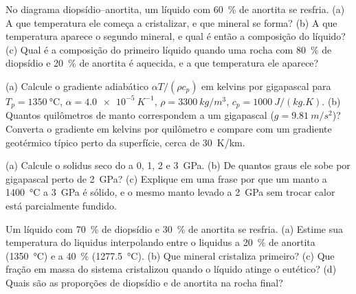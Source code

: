 \begin{exercise}[$\star$]\label{exo:b2:mantle-melting:2}
No diagrama diopsídio--anortita, um líquido com \qty{60}{\percent} de anortita
se resfria. (a) A que temperatura ele começa a cristalizar, e que mineral
se forma? (b) A que temperatura aparece o segundo mineral, e qual é então
a composição do líquido? (c) Qual é a composição do primeiro líquido quando
uma rocha com \qty{80}{\percent} de diopsídio e \qty{20}{\percent} de anortita é aquecida,
e a que temperatura ele aparece?
\end{exercise}

\begin{exercise}[$\star$]\label{exo:b2:mantle-melting:3}
(a) Calcule o gradiente adiabático $\alpha T/(\rho c_p)$ em kelvins por gigapascal
para $T_p = \qty{1350}{\celsius}$, $\alpha = \qty{4.0e-5}{K^{-1}}$, $\rho =
\qty{3300}{kg/m^3}$, $c_p = \qty{1000}{J/(kg.K)}$. (b) Quantos quilômetros de
manto correspondem a um gigapascal ($g = \qty{9.81}{m/s^2}$)? Converta o gradiente em kelvins
por quilômetro e compare com um gradiente geotérmico típico perto da superfície,
cerca de \qty{30}{K/km}.
\end{exercise}

\begin{exercise}[$\star$]\label{exo:b2:mantle-melting:4}
(a) Calcule o solidus seco do  a 0, 1, 2 e \qty{3}{GPa}. (b) De quantos
graus ele sobe por gigapascal perto de \qty{2}{GPa}? (c) Explique em uma
frase por que um manto a \qty{1400}{\celsius} a \qty{3}{GPa} é sólido, e o
mesmo manto levado a \qty{2}{GPa} sem trocar calor está parcialmente fundido.
\end{exercise}

\begin{exercise}[$\star\star$]\label{exo:b2:mantle-melting:5}
Um líquido com \qty{70}{\percent} de diopsídio e \qty{30}{\percent} de anortita se resfria.
(a) Estime sua temperatura do liquidus interpolando entre o liquidus a
\qty{20}{\percent} de anortita (\qty{1350}{\celsius}) e a \qty{40}{\percent}
(\qty{1277.5}{\celsius}). (b) Que mineral cristaliza primeiro? (c) Que fração em massa
do sistema cristalizou quando o líquido atinge o eutético?
(d) Quais são as proporções de diopsídio e de anortita na rocha final?
\end{exercise}


